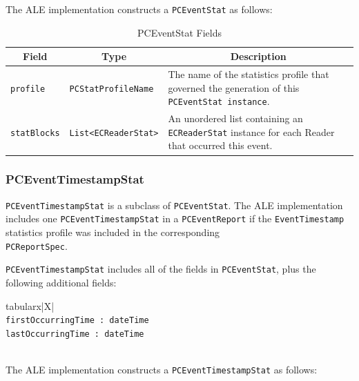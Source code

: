 \documentclass[11pt,a4paper,oneside]{article}
\newenvironment{bbox}%
{\begin{table}[h!]\begin{threeparttable}}%
{\end{threeparttable}\end{table}\FloatBarrier}
\newenvironment{bbox}
{\ifvmode\IgnorePar\fi \EndP\Tg<div class='bbox'>}{\Tg</div>\IgnoreIndent}
\begin{document}
The ALE implementation constructs a \texttt{PCEventStat} as follows:
\setlength{\intextsep}{0.7cm}
\begin{table}[!h]
\begin{tabularx}{\linewidth}{|l|l|X|}
\hline
\multicolumn{1}{|c|}{\textbf{Field}}&
\multicolumn{1}{c|}{\textbf{Type}}&
\multicolumn{1}{c|}{\textbf{Description}}\\
\hline 
\texttt{profile} &\texttt{PCStatProfileName}&The name of the statistics profile that governed the generation of this \texttt{PCEventStat instance}.\\ \hline 
\texttt{statBlocks} &\texttt{List<ECReaderStat>}&An unordered list containing an \texttt{ECReaderStat} instance for each Reader that occurred this event. \\
\hline
\end{tabularx}
\caption{PCEventStat Fields}
\MakeLineNo
\end{table}
\FloatBarrier

\subsubsection{PCEventTimestampStat}
\texttt{PCEventTimestampStat} is a subclass of \texttt{PCEventStat}. The ALE implementation includes one \texttt{PCEventTimestampStat} in a \texttt{PCEventReport} if the \texttt{EventTimestamp} statistics profile was included in the corresponding \ifpdf\\\fi\texttt{PCReportSpec}.

\texttt{PCEventTimestampStat} includes all of the fields in \texttt{PCEventStat}, plus the following additional fields:

\begin{bbox}
\begin{edtable}{tabularx}{\linewidth}{|X|}
\hline 
{}
\\
\texttt{firstOccurringTime : dateTime}\\
\texttt{lastOccurringTime : dateTime}\\
\texttt{\textendash \textendash \textendash}\\
\hline
\end{edtable}
\end{bbox}

The ALE implementation constructs a \texttt{PCEventTimestampStat} as follows:
\end{document}
